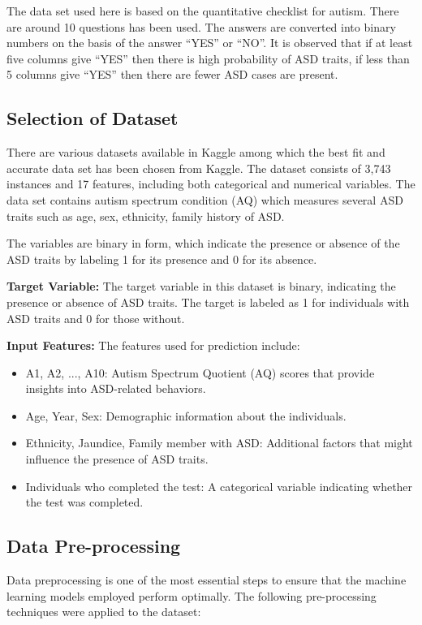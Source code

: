 \documentclass[pdflatex,sn-nature]{sn-jnl}
\theoremstyle{thmstyleone}%
\theoremstyle{thmstyletwo}%
\theoremstyle{thmstylethree}%
\begin{document}
The data set used here is based on the quantitative checklist for autism. There are around 10 questions has been used. The answers are converted into binary numbers on the basis of the answer \enquote{YES} or \enquote{NO}. It is observed that if at least five columns give \enquote{YES} then there is high probability of ASD traits, if less than 5 columns give \enquote{YES} then there are fewer ASD cases are present.

\subsection{Selection of Dataset}

There are various datasets available in Kaggle among which the best fit and accurate data set has been chosen from Kaggle. The dataset consists of 3,743 instances and 17 features, including both categorical and numerical variables. The data set contains autism spectrum condition (AQ) which measures several ASD traits such as age, sex, ethnicity, family history of ASD.

The variables are binary in form, which indicate the presence or absence of the ASD traits by labeling 1 for its presence and 0 for its absence.

\textbf{Target Variable:} The target variable in this dataset is binary, indicating the presence or absence of ASD traits. The target is labeled as 1 for individuals with ASD traits and 0 for those without.

\textbf{Input Features:} The features used for prediction include:
\begin{itemize}
    \item A1, A2, ..., A10: Autism Spectrum Quotient (AQ) scores that provide insights into ASD-related behaviors.
    \item Age, Year, Sex: Demographic information about the individuals.
    \item Ethnicity, Jaundice, Family member with ASD: Additional factors that might influence the presence of ASD traits.
    \item Individuals who completed the test: A categorical variable indicating whether the test was completed.
\end{itemize}

\subsection{Data Pre-processing}

Data preprocessing \cite{datapre} is one of the most essential steps to ensure that the machine learning models employed perform optimally. The following pre-processing techniques were applied to the dataset:
\end{document}
